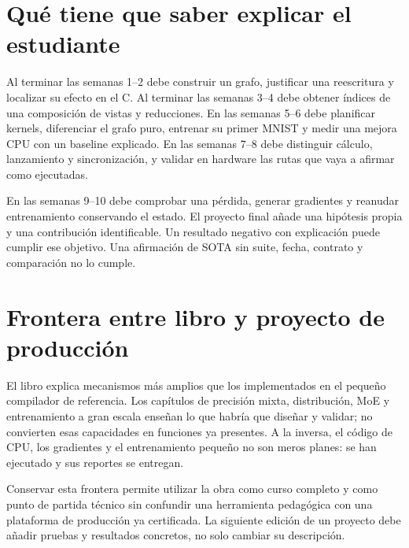 \section{Qué tiene que saber explicar el estudiante}
Al terminar las semanas 1--2 debe construir un grafo, justificar una reescritura y localizar su efecto en el C. Al terminar las semanas 3--4 debe obtener índices de una composición de vistas y reducciones. En las semanas 5--6 debe planificar kernels, diferenciar el grafo puro, entrenar su primer MNIST y medir una mejora CPU con un baseline explicado. En las semanas 7--8 debe distinguir cálculo, lanzamiento y sincronización, y validar en hardware las rutas que vaya a afirmar como ejecutadas.

En las semanas 9--10 debe comprobar una pérdida, generar gradientes y reanudar entrenamiento conservando el estado. El proyecto final añade una hipótesis propia y una contribución identificable. Un resultado negativo con explicación puede cumplir ese objetivo. Una afirmación de SOTA sin suite, fecha, contrato y comparación no lo cumple.

\section{Frontera entre libro y proyecto de producción}
El libro explica mecanismos más amplios que los implementados en el pequeño compilador de referencia. Los capítulos de precisión mixta, distribución, MoE y entrenamiento a gran escala enseñan lo que habría que diseñar y validar; no convierten esas capacidades en funciones ya presentes. A la inversa, el código de CPU, los gradientes y el entrenamiento pequeño no son meros planes: se han ejecutado y sus reportes se entregan.

Conservar esta frontera permite utilizar la obra como curso completo y como punto de partida técnico sin confundir una herramienta pedagógica con una plataforma de producción ya certificada. La siguiente edición de un proyecto debe añadir pruebas y resultados concretos, no solo cambiar su descripción.
